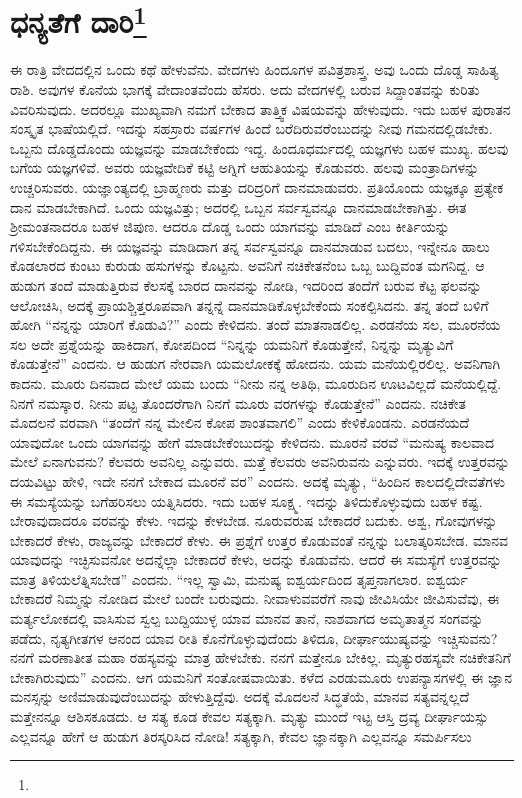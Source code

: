 
\chapter[ಧನ್ಯತೆಗೆ ದಾರಿ]{ಧನ್ಯತೆಗೆ ದಾರಿ\protect\footnote{}}

ಈ ರಾತ್ರಿ ವೇದದಲ್ಲಿನ ಒಂದು ಕಥೆ ಹೇಳುವೆನು. ವೇದಗಳು ಹಿಂದೂಗಳ ಪವಿತ್ರಶಾಸ್ತ್ರ. ಅವು ಒಂದು ದೊಡ್ಡ ಸಾಹಿತ್ಯ ರಾಶಿ. ಅವುಗಳ ಕೊನೆಯ ಭಾಗಕ್ಕೆ ವೇದಾಂತವೆಂದು ಹೆಸರು. ಅದು ವೇದಗಳಲ್ಲಿ ಬರುವ ಸಿದ್ದಾಂತವನ್ನು ಕುರಿತು ವಿವರಿಸುವುದು. ಅದರಲ್ಲೂ ಮುಖ್ಯವಾಗಿ ನಮಗೆ ಬೇಕಾದ ತಾತ್ತ್ವಿಕ ವಿಷಯವನ್ನು ಹೇಳುವುದು. ಇದು ಬಹಳ ಪುರಾತನ ಸಂಸ್ಕೃತ ಭಾಷೆಯಲ್ಲಿದೆ. ಇದನ್ನು ಸಹಸ್ರಾರು ವರ್ಷಗಳ ಹಿಂದೆ ಬರೆದಿರುವರೆಂಬುದನ್ನು ನೀವು ಗಮನದಲ್ಲಿಡಬೇಕು. ಒಬ್ಬನು ದೊಡ್ಡದೊಂದು ಯಜ್ಞವನ್ನು ಮಾಡಬೇಕೆಂದು ಇದ್ದ. ಹಿಂದೂಧರ್ಮದಲ್ಲಿ ಯಜ್ಞಗಳು ಬಹಳ ಮುಖ್ಯ. ಹಲವು ಬಗೆಯ ಯಜ್ಞಗಳಿವೆ. ಅವರು ಯಜ್ಞವೇದಿಕೆ ಕಟ್ಟಿ ಅಗ್ನಿಗೆ ಆಹುತಿಯನ್ನು ಕೊಡುವರು. ಹಲವು ಮಂತ್ರಾದಿಗಳನ್ನು ಉಚ್ಚರಿಸುವರು. ಯಜ್ಞಾಂತ್ಯದಲ್ಲಿ ಬ್ರಾಹ್ಮಣರು ಮತ್ತು ದರಿದ್ರರಿಗೆ ದಾನಮಾಡುವರು. ಪ್ರತಿಯೊಂದು ಯಜ್ಞಕ್ಕೂ ಪ್ರತ್ಯೇಕ ದಾನ ಮಾಡಬೇಕಾಗಿದೆ. ಒಂದು ಯಜ್ಞವಿತ್ತು; ಅದರಲ್ಲಿ ಒಬ್ಬನ ಸರ್ವಸ್ವವನ್ನೂ ದಾನಮಾಡಬೇಕಾಗಿತ್ತು. ಈತ ಶ‍್ರೀಮಂತನಾದರೂ ಬಹಳ ಜಿಪುಣ. ಆದರೂ ದೊಡ್ಡ ಒಂದು ಯಾಗವನ್ನು ಮಾಡಿದೆ ಎಂಬ ಕೀರ್ತಿಯನ್ನು ಗಳಿಸಬೇಕೆಂದಿದ್ದನು. ಈ ಯಜ್ಞವನ್ನು ಮಾಡಿದಾಗ ತನ್ನ ಸರ್ವಸ್ವವನ್ನೂ ದಾನಮಾಡುವ ಬದಲು, ಇನ್ನೇನೂ ಹಾಲು ಕೊಡಲಾರದ ಕುಂಟು ಕುರುಡು ಹಸುಗಳನ್ನು ಕೊಟ್ಟನು. ಅವನಿಗೆ ನಚಿಕೇತನೆಂಬ ಒಬ್ಬ ಬುದ್ದಿವಂತ ಮಗನಿದ್ದ. ಆ ಹುಡುಗ ತಂದೆ ಮಾಡುತ್ತಿರುವ ಕೆಲಸಕ್ಕೆ ಬಾರದ ದಾನವನ್ನು ನೋಡಿ, ಇದರಿಂದ ತಂದೆಗೆ ಬರುವ ಕೆಟ್ಟ ಫಲವನ್ನು ಆಲೋಚಿಸಿ, ಅದಕ್ಕೆ ಪ್ರಾಯಶ್ಚಿತ್ತರೂಪವಾಗಿ ತನ್ನನ್ನೆ ದಾನಮಾಡಿಕೊಳ್ಳಬೇಕೆಂದು ಸಂಕಲ್ಪಿಸಿದನು. ತನ್ನ ತಂದೆ ಬಳಿಗೆ ಹೋಗಿ “ನನ್ನನ್ನು ಯಾರಿಗೆ ಕೊಡುವಿ?'' ಎಂದು ಕೇಳಿದನು. ತಂದೆ ಮಾತನಾಡಲಿಲ್ಲ. ಎರಡನೆಯ ಸಲ, ಮೂರನೆಯ ಸಲ ಅದೇ ಪ್ರಶ್ನೆಯನ್ನು ಹಾಕಿದಾಗ, ಕೋಪದಿಂದ “ನಿನ್ನನ್ನು ಯಮನಿಗೆ ಕೊಡುತ್ತೇನೆ, ನಿನ್ನನ್ನು ಮೃತ್ಯುವಿಗೆ ಕೊಡುತ್ತೇನೆ'' ಎಂದನು. ಆ ಹುಡುಗ ನೇರವಾಗಿ ಯಮಲೋಕಕ್ಕೆ ಹೋದನು. ಯಮ ಮನೆಯಲ್ಲಿರಲಿಲ್ಲ. ಅವನಿಗಾಗಿ ಕಾದನು. ಮೂರು ದಿನವಾದ ಮೇಲೆ ಯಮ ಬಂದು “ನೀನು ನನ್ನ ಅತಿಥಿ, ಮೂರುದಿನ ಊಟವಿಲ್ಲದೆ ಮನೆಯಲ್ಲಿದ್ದೆ. ನಿನಗೆ ನಮಸ್ಕಾರ. ನೀನು ಪಟ್ಟ ತೊಂದರೆಗಾಗಿ ನಿನಗೆ ಮೂರು ವರಗಳನ್ನು ಕೊಡುತ್ತೇನೆ” ಎಂದನು. ನಚಿಕೇತ ಮೊದಲನೆ ವರವಾಗಿ “ತಂದೆಗೆ ನನ್ನ ಮೇಲಿನ ಕೋಪ ಶಾಂತವಾಗಲಿ'' ಎಂದು ಕೇಳಿಕೊಂಡನು. ಎರಡನೆಯದೆ ಯಾವುದೋ ಒಂದು ಯಾಗವನ್ನು ಹೇಗೆ ಮಾಡಬೇಕೆಂಬುದನ್ನು ಕೇಳಿದನು. ಮೂರನೆ ವರವೆ “ಮನುಷ್ಯ ಕಾಲವಾದ ಮೇಲೆ ಏನಾಗುವನು? ಕೆಲವರು ಅವನಿಲ್ಲ ಎನ್ನುವರು. ಮತ್ತೆ ಕೆಲವರು ಅವನಿರುವನು ಎನ್ನುವರು. ಇದಕ್ಕೆ ಉತ್ತರವನ್ನು ದಯವಿಟ್ಟು ಹೇಳಿ, ಇದೇ ನನಗೆ ಬೇಕಾದ ಮೂರನೆ ವರ'' ಎಂದನು. ಅದಕ್ಕೆ ಮೃತ್ಯು, “ಹಿಂದಿನ ಕಾಲದಲ್ಲಿ\break ದೇವತೆಗಳು ಈ ಸಮಸ್ಯೆಯನ್ನು ಬಗೆಹರಿಸಲು ಯತ್ನಿಸಿದರು. ಇದು ಬಹಳ ಸೂಕ್ಷ್ಮ. ಇದನ್ನು ತಿಳಿದುಕೊಳ್ಳುವುದು ಬಹಳ ಕಷ್ಟ. ಬೇರಾವುದಾದರೂ ವರವನ್ನು ಕೇಳು. ಇದನ್ನು ಕೇಳಬೇಡ. ನೂರುವರುಷ ಬೇಕಾದರೆ ಬದುಕು. ಅಶ್ವ, ಗೋವುಗಳನ್ನು ಬೇಕಾದರೆ ಕೇಳು, ರಾಜ್ಯವನ್ನು ಬೇಕಾದರೆ ಕೇಳು. ಈ ಪ್ರಶ್ನೆಗೆ ಉತ್ತರ ಕೊಡುವಂತೆ ನನ್ನನ್ನು ಬಲಾತ್ಕರಿಸಬೇಡ. ಮಾನವ ಯಾವುದನ್ನು ಇಚ್ಛಿಸುವನೋ ಅದನ್ನೆಲ್ಲಾ ಬೇಕಾದರೆ ಕೇಳು, ಅದನ್ನು ಕೊಡುವೆನು. ಆದರೆ ಈ ಸಮಸ್ಯೆಗೆ ಉತ್ತರವನ್ನು ಮಾತ್ರ ತಿಳಿಯಲೆತ್ನಿಸಬೇಡ'' ಎಂದನು. “ಇಲ್ಲ ಸ್ವಾಮಿ, ಮನುಷ್ಯ ಐಶ್ವರ್ಯದಿಂದ ತೃಪ್ತನಾಗಲಾರ. ಐಶ್ವರ್ಯ ಬೇಕಾದರೆ ನಿಮ್ಮನ್ನು ನೋಡಿದ ಮೇಲೆ ಬಂದೇ ಬರುವುದು. ನೀವಾಳುವವರೆಗೆ ನಾವು ಜೀವಿಸಿಯೇ ಜೀವಿಸುವೆವು, ಈ ಮರ್ತ್ಯಲೋಕದಲ್ಲಿ ವಾಸಿಸುವ ಸ್ವಲ್ಪ ಬುದ್ದಿಯುಳ್ಳ ಯಾವ ಮಾನವ ತಾನೆ, ನಾಶವಾಗದ ಅಮೃತಾತ್ಮನ ಸಂಗವನ್ನು ಪಡೆದು, ನೃತ್ಯಗೀತಗಳ ಆನಂದ ಯಾವ ರೀತಿ ಕೊನೆಗೊಳ್ಳುವುದೆಂದು ತಿಳಿದೂ, ದೀರ್ಘಾಯುಷ್ಯವನ್ನು ಇಚ್ಚಿಸುವನು? ನನಗೆ ಮರಣಾತೀತ ಮಹಾ ರಹಸ್ಯವನ್ನು ಮಾತ್ರ ಹೇಳಬೇಕು. ನನಗೆ ಮತ್ತೇನೂ ಬೇಕಿಲ್ಲ. ಮೃತ್ಯುರಹಸ್ಯವೇ ನಚಿಕೇತನಿಗೆ ಬೇಕಾಗಿರುವುದು” ಎಂದನು. ಆಗ ಯಮನಿಗೆ ಸಂತೋಷವಾಯಿತು. ಕಳೆದ ಎರಡುಮೂರು ಉಪನ್ಯಾಸಗಳಲ್ಲಿ ಈ ಜ್ಞಾನ ಮನಸ್ಸನ್ನು ಅಣಿಮಾಡುವುದೆಂಬುದನ್ನು ಹೇಳುತ್ತಿದ್ದೆವು. ಅದಕ್ಕೆ ಮೊದಲನೆ ಸಿದ್ಧತೆಯೆ, ಮಾನವ ಸತ್ಯವನ್ನಲ್ಲದೆ ಮತ್ತೇನನ್ನೂ ಆಶಿಸಕೂಡದು. ಆ ಸತ್ಯ ಕೂಡ ಕೇವಲ ಸತ್ಯಕ್ಕಾಗಿ. ಮೃತ್ಯು ಮುಂದೆ ಇಟ್ಟ ಆಸ್ತಿ ದ್ರವ್ಯ ದೀರ್ಘಾಯಸ್ಸು ಎಲ್ಲವನ್ನೂ ಹೇಗೆ ಆ ಹುಡುಗ ತಿರಸ್ಕರಿಸಿದ ನೋಡಿ! ಸತ್ಯಕ್ಕಾಗಿ, ಕೇವಲ ಜ್ಞಾನಕ್ಕಾಗಿ ಎಲ್ಲವನ್ನೂ ಸಮರ್ಪಿಸಲು 